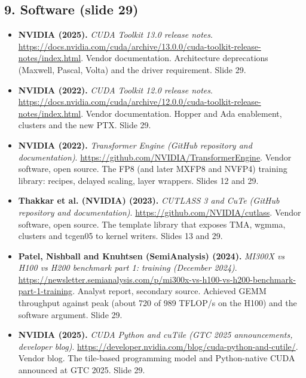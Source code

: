 \subsection*{9. Software (slide 29)}
\begin{itemize}[leftmargin=1.2em,itemsep=3pt]\sloppy
\item \textbf{NVIDIA (2025).} \textit{CUDA Toolkit 13.0 release notes}. \url{https://docs.nvidia.com/cuda/archive/13.0.0/cuda-toolkit-release-notes/index.html}. Vendor documentation. Architecture deprecations (Maxwell, Pascal, Volta) and the driver requirement. Slide 29.
\item \textbf{NVIDIA (2022).} \textit{CUDA Toolkit 12.0 release notes}. \url{https://docs.nvidia.com/cuda/archive/12.0.0/cuda-toolkit-release-notes/index.html}. Vendor documentation. Hopper and Ada enablement, clusters and the new PTX. Slide 29.
\item \textbf{NVIDIA (2022).} \textit{Transformer Engine (GitHub repository and documentation)}. \url{https://github.com/NVIDIA/TransformerEngine}. Vendor software, open source. The FP8 (and later MXFP8 and NVFP4) training library: recipes, delayed scaling, layer wrappers. Slides 12 and 29.
\item \textbf{Thakkar et al. (NVIDIA) (2023).} \textit{CUTLASS 3 and CuTe (GitHub repository and documentation)}. \url{https://github.com/NVIDIA/cutlass}. Vendor software, open source. The template library that exposes TMA, wgmma, clusters and tcgen05 to kernel writers. Slides 13 and 29.
\item \textbf{Patel, Nishball and Knuhtsen (SemiAnalysis) (2024).} \textit{MI300X vs H100 vs H200 benchmark part 1: training (December 2024)}. \url{https://newsletter.semianalysis.com/p/mi300x-vs-h100-vs-h200-benchmark-part-1-training}. Analyst report, secondary source. Achieved GEMM throughput against peak (about 720 of 989 TFLOP/s on the H100) and the software argument. Slide 29.
\item \textbf{NVIDIA (2025).} \textit{CUDA Python and cuTile (GTC 2025 announcements, developer blog)}. \url{https://developer.nvidia.com/blog/cuda-python-and-cutile/}. Vendor blog. The tile-based programming model and Python-native CUDA announced at GTC 2025. Slide 29.
\end{itemize}
